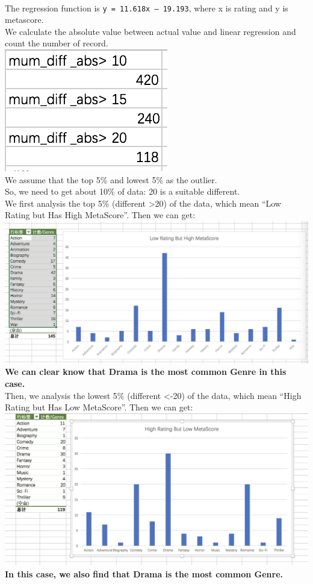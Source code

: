 \documentclass[11pt]{article}
\makeatletter
\def\maxwidth{\ifdim\Gin@nat@width>\linewidth\linewidth
    \else\Gin@nat@width\fi}
\let\Oldincludegraphics\includegraphics
\renewcommand{\includegraphics}[1]{\Oldincludegraphics[width=.8\maxwidth]{#1}}
\makeatother
\begin{document}
\\
The regression function is \texttt{y\ =\ 11.618x\ –\ 19.193}, where x is
rating and y is metascore.
\\
We calculate the absolute value between actual value and linear
regression and count the number of record.
\\
\includegraphics{abs-value.png}
\\
We assume that the top 5\% and lowest 5\% as the outlier.
\\
So, we need to get about 10\% of data: 20 is a suitable different.
\\
We first analysis the top 5\% (different \textgreater{}20) of the data,
which mean ``Low Rating but Has High MetaScore''. Then we can get: 
\\
\includegraphics{5-precent.png}
\\
\textbf{We can clear know that Drama is the most common Genre in this
case.}
\\
Then, we analysis the lowest 5\% (different \textless{}-20) of the data,
which mean ``High Rating but Has Low MetaScore''. Then we can get:
\\
\includegraphics{high.png}
\\
\textbf{In this case, we also find that Drama is the most common Genre.}
\end{document}

